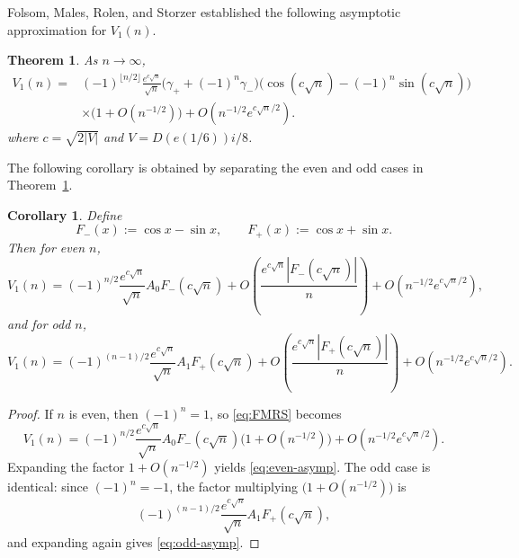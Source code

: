 \documentclass[reqno]{amsart}
\theoremstyle{definition}
\theoremstyle{plain}
\newtheorem{theorem}    {Theorem}
\newtheorem{corollary}  {Corollary}
\theoremstyle{remark}
\numberwithin{equation}{section}
\begin{document}
Folsom, Males, Rolen, and Storzer established the following asymptotic approximation for $V_1(n)$.

\begin{theorem}\label{thm:FMRS}\cite[Theorem~1.3]{FMRS}
As $n\to\infty$,
\begin{equation}\label{eq:FMRS}
\begin{split}
  V_1(n)
  ={}&(-1)^{\lfloor n/2\rfloor}
   \frac{e^{c\sqrt n}}{\sqrt n}
   \bigl(\gamma_+ + (-1)^n\gamma_-\bigr)
   \bigl(\cos(c\sqrt n)-(-1)^n\sin(c\sqrt n)\bigr)\\
   &\times\bigl(1+O(n^{-1/2})\bigr)
   +O\!\left(n^{-1/2}e^{c\sqrt n/2}\right).
\end{split}
\end{equation}
where $c=\sqrt{2|V|}$ and $V=D(e(1/6))i/8$. 
\end{theorem}

The following corollary is obtained by separating the even and odd cases in
Theorem~\ref{thm:FMRS}.

\begin{corollary}\label{cor:parity}
Define
\begin{equation}\label{eq:Fpm}
  F_-(x):=\cos x-\sin x,
  \qquad
  F_+(x):=\cos x+\sin x.
\end{equation}
Then for even $n$,
\begin{equation}\label{eq:even-asymp}
  V_1(n)
  =(-1)^{n/2}\frac{e^{c\sqrt n}}{\sqrt n}A_0 F_-(c\sqrt n)
   +O\!\left(\frac{e^{c\sqrt n}|F_-(c\sqrt n)|}{n}\right)
   +O\!\left(n^{-1/2}e^{c\sqrt n/2}\right),
\end{equation}
and for odd $n$,
\begin{equation}\label{eq:odd-asymp}
  V_1(n)
  =(-1)^{(n-1)/2}\frac{e^{c\sqrt n}}{\sqrt n}A_1 F_+(c\sqrt n)
   +O\!\left(\frac{e^{c\sqrt n}|F_+(c\sqrt n)|}{n}\right)
   +O\!\left(n^{-1/2}e^{c\sqrt n/2}\right).
\end{equation}
\end{corollary}

\begin{proof}
If $n$ is even, then $(-1)^n=1$, so \eqref{eq:FMRS} becomes
\[
  V_1(n)
  =(-1)^{n/2}\frac{e^{c\sqrt n}}{\sqrt n}A_0F_-(c\sqrt n)
   \bigl(1+O(n^{-1/2})\bigr)
   +O\!\left(n^{-1/2}e^{c\sqrt n/2}\right).
\]
Expanding the factor $1+O(n^{-1/2})$ yields \eqref{eq:even-asymp}. The odd case is identical: since $(-1)^n=-1$, the factor multiplying $\bigl(1+O(n^{-1/2})\bigr)$ is
\[
  (-1)^{(n-1)/2}\frac{e^{c\sqrt n}}{\sqrt n}A_1F_+(c\sqrt n),
\]
and expanding again gives \eqref{eq:odd-asymp}.
\end{proof}
\end{document}
